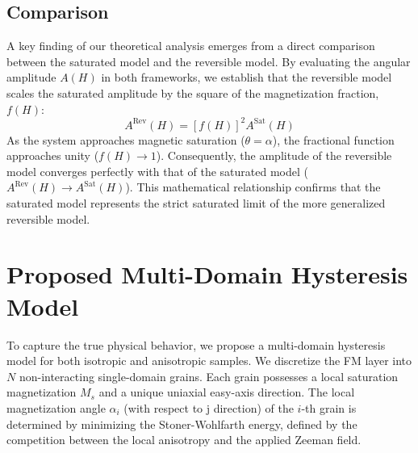 \documentclass[11pt,a4paper]{article}
\begin{document}
\subsection{Comparison}
A key finding of our theoretical analysis emerges from a direct comparison between the saturated model and the reversible model. By evaluating the angular amplitude $A(H)$ in both frameworks, we establish that the reversible model scales the saturated amplitude by the square of the magnetization fraction, $f(H)$:$$A^{\text{Rev}}(H) = [f(H)]^2 A^{\text{Sat}}(H)$$As the system approaches magnetic saturation ($\theta = \alpha$), the fractional function approaches unity ($f(H) \to 1$). Consequently, the amplitude of the reversible model converges perfectly with that of the saturated model ($A^{\text{Rev}}(H) \to A^{\text{Sat}}(H)$). This mathematical relationship confirms that the saturated model represents the strict saturated limit of the more generalized reversible model.

\section{Proposed Multi-Domain Hysteresis Model}
To capture the true physical behavior, we propose a multi-domain hysteresis model for both isotropic and anisotropic samples. We discretize the FM layer into $N$ non-interacting single-domain grains. Each grain possesses a local saturation magnetization $M_s$ and a unique uniaxial easy-axis direction. The local magnetization angle $\alpha_{i}$ (with respect to j direction) of the $i$-th grain is determined by minimizing the Stoner-Wohlfarth energy, defined by the competition between the local anisotropy and the applied Zeeman field.
\end{document}
